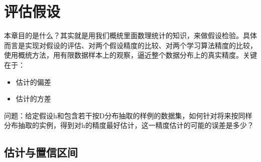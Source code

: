 \documentclass[../main.tex]{subfiles}
\begin{document}
\section{评估假设}\label{sec:hypothesis-evaluation}
本章目的是什么？其实就是用我们概统里面数理统计的知识，来做假设检验。具体而言是实现对假设的评估、对两个假设精度的比较、对两个学习算法精度的比较，使用概统方法，用有限数据样本上的观察，逼近整个数据分布上的真实精度。关键在于：
\begin{itemize}
    \item 估计的偏差
    \item 估计的方差
\end{itemize}
问题：给定假设h和包含若干按D分布抽取的样例的数据集，如何针对将来按同样分布抽取的实例，得到对h的精度最好估计，这一精度估计的可能的误差是多少？
\subsection{估计与置信区间}\label{sec:confidence-interval}
\end{document}
